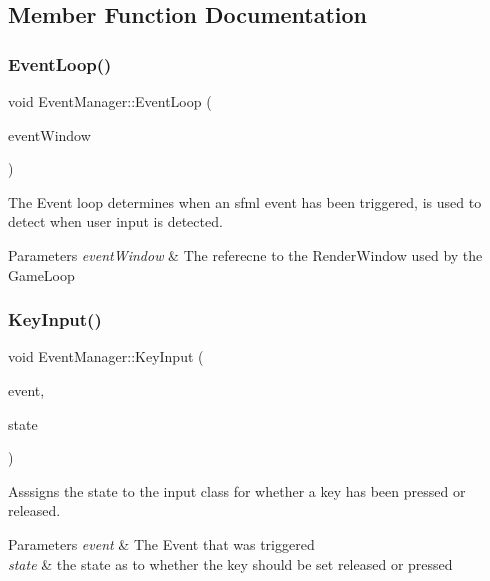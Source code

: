 \subsection{Member Function Documentation}
\mbox{\label{class_event_manager_a3e90c3658f1fc88b45ba1b8fda4f2c10}} 
\subsubsection{\texorpdfstring{Event\+Loop()}{EventLoop()}}
{\footnotesize\ttfamily void Event\+Manager\+::\+Event\+Loop (\begin{DoxyParamCaption}\item[{Render\+Window \&}]{event\+Window }\end{DoxyParamCaption})}



The Event loop determines when an sfml event has been triggered, is used to detect when user input is detected. 


\begin{DoxyParams}{Parameters}
{\em event\+Window} & The referecne to the Render\+Window used by the Game\+Loop \\
\hline
\end{DoxyParams}
\mbox{\label{class_event_manager_a279b1d4e14cd98c1b3789a5276be2b3a}} 
\subsubsection{\texorpdfstring{Key\+Input()}{KeyInput()}}
{\footnotesize\ttfamily void Event\+Manager\+::\+Key\+Input (\begin{DoxyParamCaption}\item[{const Event \&}]{event,  }\item[{bool}]{state }\end{DoxyParamCaption})\hspace{0.3cm}{\ttfamily [private]}}



Asssigns the state to the input class for whether a key has been pressed or released. 


\begin{DoxyParams}{Parameters}
{\em event} & The Event that was triggered \\
\hline
{\em state} & the state as to whether the key should be set released or pressed \\
\hline
\end{DoxyParams}


